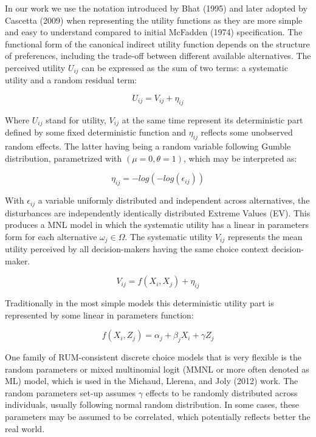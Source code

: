 \documentclass[12pt,]{article}
\begin{document}
In our work we use the notation introduced by Bhat (1995) and later
adopted by Cascetta (2009) when representing the utility functions as
they are more simple and easy to understand compared to initial McFadden
(1974) specification. The functional form of the canonical indirect
utility function depends on the structure of preferences, including the
trade-off between different available alternatives. The perceived
utility \(U_{ij}\) can be expressed as the sum of two terms: a
systematic utility and a random residual term:

\begin{equation}
U_{ij} = V_{ij} + \eta_{ij}
\end{equation}

Where \(U_{ij}\) stand for utility, \(V_{ij}\) at the same time
represent its deterministic part defined by some fixed deterministic
function and \(\eta_{ij}\) reflects some unobserved random effects. The
latter having being a random variable following Gumble distribution,
parametrized with \((\mu = 0, \theta = 1)\), which may be interpreted
as:

\begin{equation}
\eta_{ij} = - log( - log(\epsilon_{ij}))
\end{equation}

With \(\epsilon_{ij}\) a variable uniformly distributed and independent
across alternatives, the disturbances are independently identically
distributed Extreme Values (EV). This produces a MNL model in which the
systematic utility has a linear in parameters form for each alternative
\(\omega_j \in \Omega\). The systematic utility \(V_{ij}\) represents
the mean utility perceived by all decision-makers having the same choice
context decision-maker.

\begin{equation}
V_{ij} = f(X_i, X_j) + \eta_{ij}
\end{equation}

Traditionally in the most simple models this deterministic utility part
is represented by some linear in parameters function:

\begin{equation}
f(X_i, Z_j) = \alpha_j + \beta_j X_i + \gamma Z_j
\end{equation}

One family of RUM-consistent discrete choice models that is very
flexible is the random parameters or mixed multinomial logit (MMNL or
more often denoted as ML) model, which is used in the Michaud, Llerena,
and Joly (2012) work. The random parameters set-up assumes \(\gamma\)
effects to be randomly distributed across individuals, usually following
normal random distribution. In some cases, these parameters may be
assumed to be correlated, which potentially reflects better the real
world.
\end{document}
